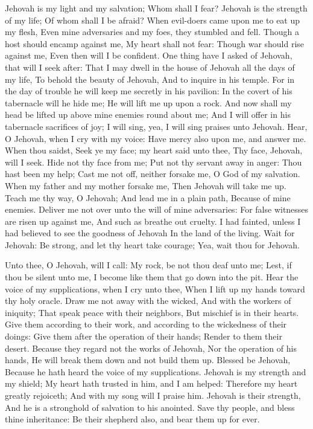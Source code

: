Jehovah is my light and my salvation; Whom shall I fear? Jehovah is the strength of my life; Of whom shall I be afraid?  When evil-doers came upon me to eat up my flesh, Even mine adversaries and my foes, they stumbled and fell.  Though a host should encamp against me, My heart shall not fear: Though war should rise against me, Even then will I be confident.  One thing have I asked of Jehovah, that will I seek after: That I may dwell in the house of Jehovah all the days of my life, To behold the beauty of Jehovah, And to inquire in his temple.  For in the day of trouble he will keep me secretly in his pavilion: In the covert of his tabernacle will he hide me; He will lift me up upon a rock.  And now shall my head be lifted up above mine enemies round about me; And I will offer in his tabernacle sacrifices of joy; I will sing, yea, I will sing praises unto Jehovah.  Hear, O Jehovah, when I cry with my voice: Have mercy also upon me, and answer me.  When thou saidst, Seek ye my face; my heart said unto thee, Thy face, Jehovah, will I seek.  Hide not thy face from me; Put not thy servant away in anger: Thou hast been my help; Cast me not off, neither forsake me, O God of my salvation.  When my father and my mother forsake me, Then Jehovah will take me up.  Teach me thy way, O Jehovah; And lead me in a plain path, Because of mine enemies.  Deliver me not over unto the will of mine adversaries: For false witnesses are risen up against me, And such as breathe out cruelty.  I had fainted, unless I had believed to see the goodness of Jehovah In the land of the living.  Wait for Jehovah: Be strong, and let thy heart take courage; Yea, wait thou for Jehovah. 

Unto thee, O Jehovah, will I call: My rock, be not thou deaf unto me; Lest, if thou be silent unto me, I become like them that go down into the pit.  Hear the voice of my supplications, when I cry unto thee, When I lift up my hands toward thy holy oracle.  Draw me not away with the wicked, And with the workers of iniquity; That speak peace with their neighbors, But mischief is in their hearts.  Give them according to their work, and according to the wickedness of their doings: Give them after the operation of their hands; Render to them their desert.  Because they regard not the works of Jehovah, Nor the operation of his hands, He will break them down and not build them up.  Blessed be Jehovah, Because he hath heard the voice of my supplications.  Jehovah is my strength and my shield; My heart hath trusted in him, and I am helped: Therefore my heart greatly rejoiceth; And with my song will I praise him.  Jehovah is their strength, And he is a stronghold of salvation to his anointed.  Save thy people, and bless thine inheritance: Be their shepherd also, and bear them up for ever. 


